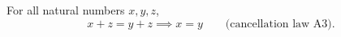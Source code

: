 For all natural numbers $x, y, z$,
$$x + z = y + z \implies x = y \qquad \text{(cancellation law A3)}.$$
